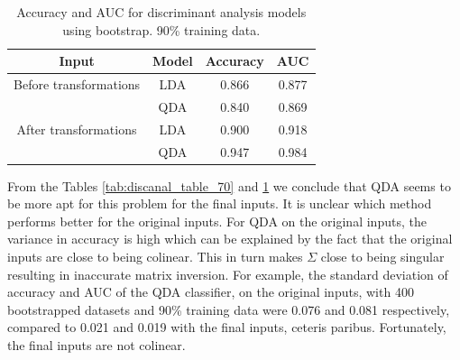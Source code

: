 \documentclass[../../project.tex]{subfiles}
\begin{document}
		\begin{table}[h!]
		\centering
			\caption{Accuracy and AUC for discriminant analysis models using bootstrap. 90\% training data.}
		\begin{tabular}{cccc}
		    \toprule
			Input & Model & Accuracy & AUC \\
			\midrule
			Before transformations
			& LDA & 0.866 & 0.877 \\
		    & QDA & 0.840 & 0.869 \\
			\midrule
			After transformations
			& LDA & 0.900 & 0.918 \\
			& QDA & 0.947 & 0.984 \\
			\bottomrule
		\end{tabular}
		\label{tab:discanal_table_90}
	\end{table}
	From the Tables \ref{tab:discanal_table_70} and \ref{tab:discanal_table_90} we conclude that QDA seems to be more apt for this problem for the final inputs. It is unclear which method performs better for the original inputs. For QDA on the original inputs, the variance in accuracy is high which can be explained by the fact that the original inputs are close to being colinear. This in turn makes $\Sigma$ close to being singular resulting in inaccurate matrix inversion. For example, the standard deviation of accuracy and AUC of the QDA classifier, on the original inputs, with 400 bootstrapped datasets and 90\% training data were 0.076 and 0.081 respectively, compared to 0.021 and 0.019 with the final inputs, ceteris paribus. Fortunately, the final inputs are not colinear.
	
\end{document}
